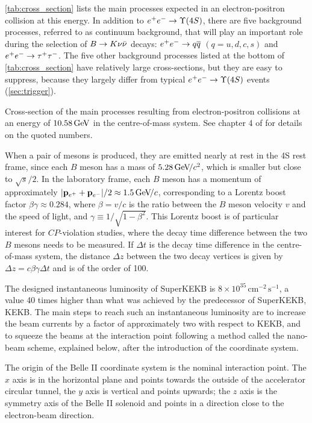 \cref{tab:cross_section} lists the main processes expected in an electron-positron collision at this energy.
In addition to $\epem\to\Y4S$, there are five background processes, referred to as continuum background, that will play an important role during the selection of $B\rightarrow K\nu\bar{\nu}$ decays: $e^+e^-\rightarrow q\overline q$ $(q=u,d,c,s)$ and $e^+e^-\rightarrow\tau^+\tau^-$.
The five other background processes listed at the bottom of \cref{tab:cross_section} have relatively large cross-sections, but they are easy to suppress, because they largely differ from typical $\epem\to\Y4S$ events (\cref{sec:trigger}).

{Cross-section of the main processes resulting from electron-positron collisions at an energy of $10.58\mathrm{\,Ge\kern -0.1em V}$ in the centre-of-mass system.
See chapter 4 of \cite{Kou2020} for details on the quoted numbers.}

When a pair of \B mesons is produced, they are emitted nearly at rest in the \Y4S rest frame, since each $B$ meson has a mass of $5.28{\mathrm{\,Ge\kern -0.1em V\!/}c^2}$, which is smaller but close to $\sqrt{s}/2$. 
In the laboratory frame, each $B$ meson has a momentum of approximately $|\mathbf{p}_{e^+}+\mathbf{p}_{e^-}|/2\approx1.5{\mathrm{\,Ge\kern -0.1em V\!/}c}$, corresponding to a Lorentz boost factor $\beta\gamma\approx0.284$, where $\beta=v/c$ is the ratio between the $B$ meson velocity $v$ and the speed of light, and $\gamma\equiv1/\sqrt{1-\beta^2}$.
This Lorentz boost is of particular interest for $CP$-violation studies, where the decay time difference between the two $B$ mesons needs to be measured.
If $\Delta t$ is the decay time difference in the centre-of-mass system, the distance $\Delta z$ between the two decay vertices is given by $\Delta z=c\beta\gamma\Delta t$ and is of the order of 100\mum. 

The designed instantaneous luminosity of SuperKEKB is $8\times10^{35}\mathrm{\,cm^{-2}\,s^{-1}}$, a value 40 times higher than what was achieved by the predecessor of SuperKEKB, KEKB.
The main steps to reach such an instantaneous luminosity are to increase the beam currents by a factor of approximately two with respect to KEKB, and to squeeze the beams at the interaction point following a method called the nano-beam scheme, explained below, after the introduction of the coordinate system.

The origin of the Belle II coordinate system is the nominal interaction point.
The $x$ axis is in the horizontal plane and points towards the outside of the accelerator circular tunnel, the $y$ axis is vertical and points upwards; the $z$ axis is the symmetry axis of the Belle II solenoid and points in a direction close to the electron-beam direction.

